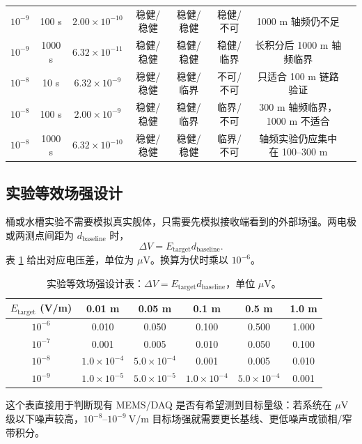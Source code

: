 \begin{table}[H]
{\begin{tabular}{cccccccc}
$10^{-9}$ & 100 s & $2.00\times10^{-10}$ & 稳健/稳健 & 稳健/稳健 & 稳健/不可 & 1000 m 轴频仍不足 \\
$10^{-9}$ & 1000 s & $6.32\times10^{-11}$ & 稳健/稳健 & 稳健/稳健 & 稳健/临界 & 长积分后 1000 m 轴频临界 \\
$10^{-8}$ & 10 s & $6.32\times10^{-9}$ & 稳健/稳健 & 稳健/临界 & 不可/不可 & 只适合 100 m 链路验证 \\
$10^{-8}$ & 100 s & $2.00\times10^{-9}$ & 稳健/稳健 & 稳健/临界 & 临界/不可 & 300 m 轴频临界，1000 m 不适合 \\
$10^{-8}$ & 1000 s & $6.32\times10^{-10}$ & 稳健/稳健 & 稳健/稳健 & 临界/不可 & 轴频实验仍应集中在 100--300 m \\
\bottomrule
\end{tabular}}
\end{table}

\subsection{实验等效场强设计}

桶或水槽实验不需要模拟真实舰体，只需要先模拟接收端看到的外部场强。两电极或两测点间距为 $d_{\mathrm{baseline}}$ 时，
\[
\Delta V=E_{\mathrm{target}}d_{\mathrm{baseline}}.
\]
表 \ref{tab:lab-voltage-design} 给出对应电压差，单位为 $\mu$V。换算为伏时乘以 $10^{-6}$。

\begin{table}[H]
\centering
\caption{实验等效场强设计表：$\Delta V=E_{\mathrm{target}}d_{\mathrm{baseline}}$，单位 $\mu$V。}
\label{tab:lab-voltage-design}
\begin{tabular}{cccccc}
\toprule
$E_{\mathrm{target}}$ (V/m) & 0.01 m & 0.05 m & 0.1 m & 0.5 m & 1.0 m \\
\midrule
$10^{-6}$ & 0.010 & 0.050 & 0.100 & 0.500 & 1.000 \\
$10^{-7}$ & 0.001 & 0.005 & 0.010 & 0.050 & 0.100 \\
$10^{-8}$ & $1.0\times10^{-4}$ & $5.0\times10^{-4}$ & 0.001 & 0.005 & 0.010 \\
$10^{-9}$ & $1.0\times10^{-5}$ & $5.0\times10^{-5}$ & $1.0\times10^{-4}$ & $5.0\times10^{-4}$ & 0.001 \\
\bottomrule
\end{tabular}
\end{table}

这个表直接用于判断现有 MEMS/DAQ 是否有希望测到目标量级：若系统在 $\mu$V 级以下噪声较高，$10^{-8}$--$10^{-9}\ \mathrm{V/m}$ 目标场强就需要更长基线、更低噪声或锁相/窄带积分。


